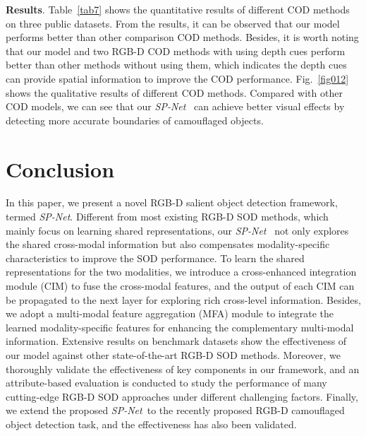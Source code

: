 \documentclass[10pt,twocolumn,letterpaper]{article}
\def\ours{\emph{SP-Net}}
\begin{document}
\textbf{Results}. Table~\ref{tab7} shows the quantitative results of different COD methods on three public datasets. From the results, it can be observed that our model performs better than other comparison COD methods. Besides, it is worth noting that our model and two RGB-D COD methods with using depth cues perform better than other methods without using them, which indicates the depth cues can provide spatial information to improve the COD performance. Fig.~\ref{fig012} shows the qualitative results of different COD methods. Compared with other COD models, we can see that our \ours~ can achieve better visual effects by detecting more accurate boundaries of camouflaged objects.


\section{Conclusion}

In this paper, we present a novel RGB-D salient object detection framework, termed \ours. Different from most existing RGB-D SOD methods, which mainly focus on learning shared representations, our \ours~ not only explores the shared cross-modal information but also compensates modality-specific characteristics to improve the SOD performance. To learn the shared representations for the two modalities, we introduce a cross-enhanced integration module (CIM) to fuse the cross-modal features, and the output of each CIM can be propagated to the next layer for exploring rich cross-level information. Besides, we adopt a multi-modal feature aggregation (MFA) module to integrate the learned modality-specific features for enhancing the complementary multi-modal information. Extensive results on benchmark datasets show the effectiveness of our model against other state-of-the-art RGB-D SOD methods. Moreover, we thoroughly validate the effectiveness of key components in our framework, and an attribute-based evaluation is conducted to study the performance of many cutting-edge RGB-D SOD approaches under different challenging factors. Finally, we extend the proposed \ours~to the recently proposed RGB-D camouflaged object detection task, and the effectiveness has also been validated. \\



{\small


}
\end{document}
